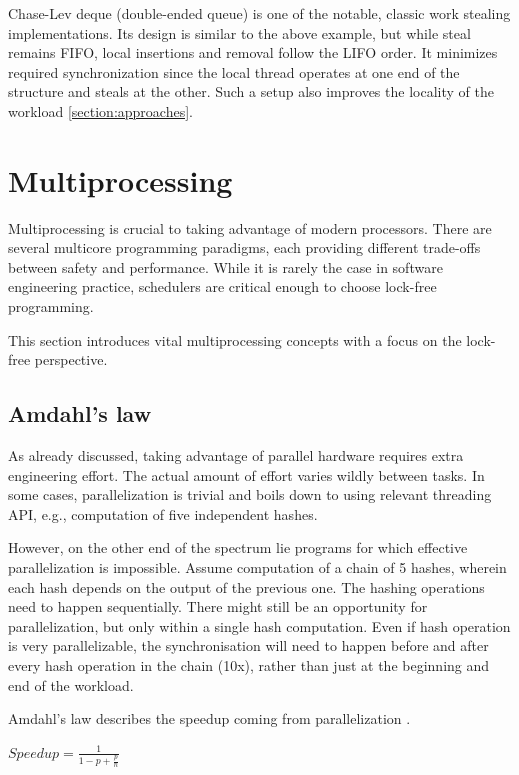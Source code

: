 \documentclass[12pt,a4paper,twoside]{report}
\begin{document}
\label{paragraph:deque}
Chase-Lev deque (double-ended queue) is one of the notable, classic work stealing implementations. Its design is similar to the above example, but while steal remains FIFO, local insertions and removal follow the LIFO order. It minimizes required synchronization since the local thread operates at one end of the structure and steals at the other. Such a setup also improves the locality of the workload \ref{section:approaches}. 

\section{Multiprocessing}
\label{section:background_multiprocessing}

Multiprocessing is crucial to taking advantage of modern processors. There are several multicore programming paradigms, each providing different trade-offs between safety and performance. While it is rarely the case in software engineering practice, schedulers are critical enough to choose lock-free programming. 

This section introduces vital multiprocessing concepts with a focus on the lock-free perspective.  

\subsection{Amdahl's law}
As already discussed, taking advantage of parallel hardware requires extra engineering effort. The actual amount of effort varies wildly between tasks. In some cases, parallelization is trivial and boils down to using relevant threading API, e.g., computation of five independent hashes. 

However, on the other end of the spectrum lie programs for which effective parallelization is impossible. Assume computation of a chain of 5 hashes, wherein each hash depends on the output of the previous one. The hashing operations need to happen sequentially. There might still be an opportunity for parallelization, but only within a single hash computation. Even if hash operation is very parallelizable, the synchronisation will need to happen before and after every hash operation in the chain (10x), rather than just at the beginning and end of the workload. 

Amdahl's law describes the speedup coming from parallelization \cite{art_of_mult}.

\begin{center}
$Speedup = \frac{1}{1 - p + \frac{p}{n}}$
\end{center} 
\end{document}
